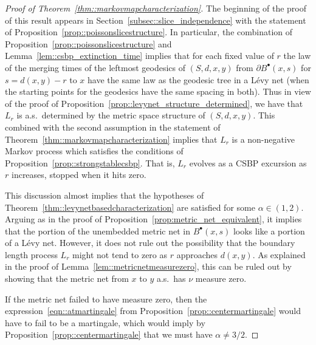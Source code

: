 \documentclass[JEP,XML,SOM,Unicode]{cedram}
\newcommand{\sbullet}{{\scriptscriptstyle\bullet}}
\theoremstyle{plain}
\numberwithin{theorem}{section}
\theoremstyle{definition}
\newcommand{\fb}[2]{B^\sbullet(#1,#2)}
\begin{document}
\begin{proof}[Proof of Theorem~\ref{thm::markovmapcharacterization}]
The beginning of the proof of this result appears in Section~\ref{subsec::slice_independence} with the statement of Proposition~\ref{prop::poissonslicestructure}. In particular, the combination of Proposition~\ref{prop::poissonslicestructure} and Lemma~\ref{lem::csbp_extinction_time} implies that for each fixed value of $r$ the law of the merging times of the leftmost geodesics of $(S,d,x,y)$ from $\partial \fb{x}{s}$ for $s=d(x,y)-r$ to $x$ have the same law as the geodesic tree in a Lévy net (when the starting points for the geodesics have the same spacing in both). Thus in view of the proof of Proposition~\ref{prop::levynet_structure_determined}, we have that $L_r$ is a.s.\ determined by the metric space structure of $(S,d,x,y)$. This combined with the second assumption in the statement of Theorem~\ref{thm::markovmapcharacterization} implies that $L_r$ is a non-negative Markov process which satisfies the conditions of Proposition~\ref{prop::strongstablecsbp}. That is, $L_r$ evolves as a CSBP excursion as $r$ increases, stopped when it hits zero.

This discussion almost implies that the hypotheses of Theorem~\ref{thm::levynetbasedcharacterization} are satisfied for some $\alpha \in (1,2)$. Arguing as in the proof of Proposition~\ref{prop:metric_net_equivalent}, it implies that the portion of the unembedded metric net in $\fb{x}{s}$ looks like a portion of a Lévy net. However, it does not rule out the possibility that the boundary length process $L_r$ might not tend to zero as $r$ approaches $d(x,y)$. As explained in the proof of Lemma~\ref{lem::metricnetmeasurezero}, this can be ruled out by showing that the metric net from $x$ to $y$ a.s.\ has $\nu$ measure zero.

If the metric net failed to have measure zero, then the expression~\eqref{eqn::atmartingale} from Proposition~\ref{prop::centermartingale} would have to fail to be a martingale, which would imply by Proposition~\ref{prop::centermartingale} that we must have $\alpha \not = 3/2$.


\end{proof}
\end{document}

